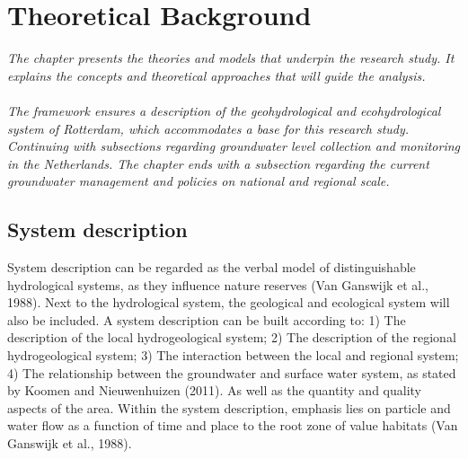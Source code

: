 \chapter{Theoretical Background}
\textit{The chapter presents the theories and models that underpin the research study. It explains the concepts and theoretical approaches that will guide the analysis.} \\
\\
\textit{The framework ensures a description of the geohydrological and ecohydrological system of Rotterdam, which accommodates a base for this research study. Continuing with subsections regarding groundwater level collection and monitoring in the Netherlands. The chapter ends with a subsection regarding the current groundwater management and policies on national and regional scale.}



\section{System description}
System description can be regarded as the verbal model of distinguishable hydrological systems, as they influence nature reserves (Van Ganswijk et al., 1988). Next to the hydrological system, the geological and ecological system will also be included. A system description can be built according to: 1) The description of the local hydrogeological system; 2) The description of the regional hydrogeological system; 3) The interaction between the local and regional system; 4) The relationship between the groundwater and surface water system, as stated by Koomen and Nieuwenhuizen (2011). As well as the quantity and quality aspects of the area. Within the system description, emphasis lies on particle and water flow as a function of time and place to the root zone of value habitats (Van Ganswijk et al., 1988). 

